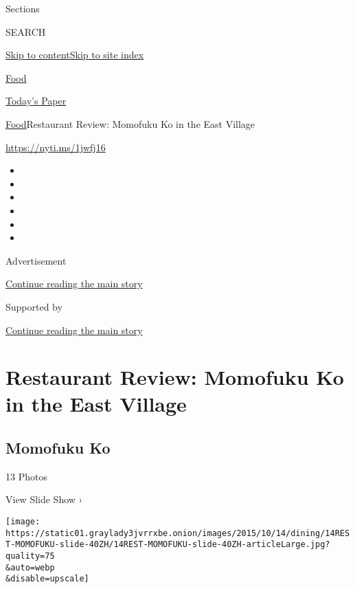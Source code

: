 Sections

SEARCH

\protect\hyperlink{site-content}{Skip to
content}\protect\hyperlink{site-index}{Skip to site index}

\href{https://www.nytimes3xbfgragh.onion/section/food}{Food}

\href{https://myaccount.nytimes3xbfgragh.onion/auth/login?response_type=cookie\&client_id=vi}{}

\href{https://www.nytimes3xbfgragh.onion/section/todayspaper}{Today's
Paper}

\href{/section/food}{Food}\textbar{}Restaurant Review: Momofuku Ko in
the East Village

\url{https://nyti.ms/1jwfj16}

\begin{itemize}
\item
\item
\item
\item
\item
\item
\end{itemize}

Advertisement

\protect\hyperlink{after-top}{Continue reading the main story}

Supported by

\protect\hyperlink{after-sponsor}{Continue reading the main story}

\hypertarget{restaurant-review-momofuku-ko-in-the-east-village}{%
\section{Restaurant Review: Momofuku Ko in the East
Village}\label{restaurant-review-momofuku-ko-in-the-east-village}}

\href{https://www.nytimes3xbfgragh.onion/slideshow/2015/10/14/dining/momofuku-ko.html}{}

\hypertarget{momofuku-ko}{%
\subsection{Momofuku Ko}\label{momofuku-ko}}

13 Photos

View Slide Show ›

\texttt{[image: https://static01.graylady3jvrrxbe.onion/images/2015/10/14/dining/14REST-MOMOFUKU-slide-40ZH/14REST-MOMOFUKU-slide-40ZH-articleLarge.jpg?quality=75\\\&auto=webp\\\&disable=upscale]}

